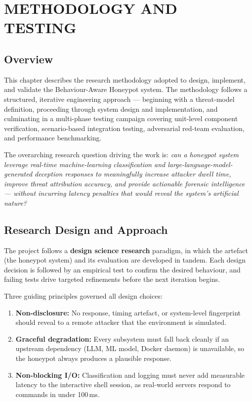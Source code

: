 
\chapter{\MakeUppercase{Methodology and Testing}}

\section{Overview}

This chapter describes the research methodology adopted to design, implement, and validate the Behaviour-Aware Honeypot system. The methodology follows a structured, iterative engineering approach — beginning with a threat-model definition, proceeding through system design and implementation, and culminating in a multi-phase testing campaign covering unit-level component verification, scenario-based integration testing, adversarial red-team evaluation, and performance benchmarking.

The overarching research question driving the work is: \textit{can a honeypot system leverage real-time machine-learning classification and large-language-model-generated deception responses to meaningfully increase attacker dwell time, improve threat attribution accuracy, and provide actionable forensic intelligence — without incurring latency penalties that would reveal the system's artificial nature?}

\section{Research Design and Approach}

The project follows a \textbf{design science research} paradigm, in which the artefact (the honeypot system) and its evaluation are developed in tandem. Each design decision is followed by an empirical test to confirm the desired behaviour, and failing tests drive targeted refinements before the next iteration begins.

Three guiding principles governed all design choices:

\begin{enumerate}
    \item \textbf{Non-disclosure:} No response, timing artefact, or system-level fingerprint should reveal to a remote attacker that the environment is simulated.
    \item \textbf{Graceful degradation:} Every subsystem must fall back cleanly if an upstream dependency (LLM, ML model, Docker daemon) is unavailable, so the honeypot always produces a plausible response.
    \item \textbf{Non-blocking I/O:} Classification and logging must never add measurable latency to the interactive shell session, as real-world servers respond to commands in under 100\,ms.
\end{enumerate}

